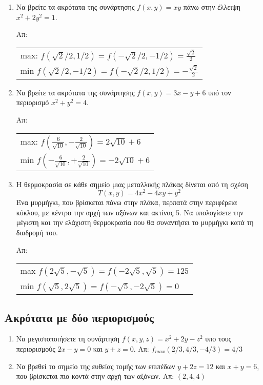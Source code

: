 \documentclass[a4paper,table]{report}
\begin{document}
\begin{enumerate}
  \item Να βρείτε τα ακρότατα της συνάρτησης $ f(x,y) = xy $ πάνω στην έλλειψη 
    $ x^{2}+2y^{2}=1 $.

    \hfill Απ: 
    \begin{tabular}{l}
      max: $ f(\sqrt{2} /2, 1/2) = f(- \sqrt{2} /2, -1/2) = \frac{\sqrt{2}}{2} $ \\
      min $ f(\sqrt{2} /2, -1/2) = f(- \sqrt{2} /2, 1/2) = -\frac{\sqrt{2}}{2} $ \\
    \end{tabular}

  \item Να βρείτε τα ακρότατα της συνάρτησης $ f(x,y) = 3x-y+6 $ υπό τον περιορισμό 
    $ x^{2}+y^{2}=4 $.

    \hfill Απ:  
    \begin{tabular}{l}
      max: $ f(\frac{6}{\sqrt{10}} , - \frac{2}{\sqrt{10}}) = 2 \sqrt{10} +6 $ \\
      min $ f(-\frac{6}{\sqrt{10}} , + \frac{2}{\sqrt{10}}) = -2 \sqrt{10} +6 $ \\
    \end{tabular}

  \item Η θερμοκρασία σε κάθε σημείο μιας μεταλλικής πλάκας δίνεται από τη σχέση
    \[
      T(x,y) = 4x^{2}-4xy+y^2 
    \]
    Ένα μυρμήγκι, που βρίσκεται πάνω στην πλάκα, περπατά στην περιφέρεια κύκλου, 
    με κέντρο την αρχή των αξόνων και ακτίνας 5. Να υπολογίσετε την μέγιστη και την 
    ελάχιστη θερμοκρασία που θα συναντήσει το μυρμήγκι κατά τη διαδρομή του.

    \hfill Απ:  
    \begin{tabular}{l}
      max $ f(2 \sqrt{5} , - \sqrt{5}) = f(-2 \sqrt{5} , \sqrt{5}) = 125 $ \\
      min $ f(\sqrt{5} , 2 \sqrt{5}) = f(- \sqrt{5} , - 2 \sqrt{5}) = 0 $ 
    \end{tabular}
\end{enumerate}


\subsection*{Ακρότατα με δύο περιορισμούς}

\begin{enumerate}
  \item Να μεγιστοποιήσετε τη συνάρτηση $ f(x,y,z) = x^{2}+2y-z^{2} $ υπο τους 
    περιορισμούς $ 2x-y=0 $ και $ y+z=0 $. 
    \hfill Απ: $ f_{max}(2/3,4/3,-4/3) = 4/3 $

  \item Να βρεθεί το σημείο της ευθείας τομής των επιπέδων $ y+2z=12 $ και $ x+y=6 $,
    που βρίσκεται πιο κοντά στην αρχή των αξόνων. 
    \hfill Απ: $(2,4,4)$ 
\end{enumerate}
\end{document}
